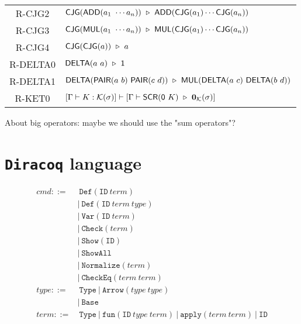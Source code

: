 \documentclass{article}
\begin{document}
\begin{longtable}{cl}
    R-CJG2
    & $ \CJG(\ADD(a_1\ \cdots a_n)) \ \reduce\ \ADD(\CJG(a_1) \cdots \CJG(a_n))$ \\
    R-CJG3
    & $ \CJG(\MUL(a_1\ \cdots a_n)) \ \reduce\ \MUL(\CJG(a_1) \cdots \CJG(a_n))$ \\
    R-CJG4
    & $ \CJG(\CJG(a)) \ \reduce\ a$ \\
    R-DELTA0
    & $ \DELTA(a\ a) \ \reduce\ \ONE$ \\
    R-DELTA1
    & $ \DELTA(\PAIR(a\ b)\ \PAIR(c\ d)) \ \reduce\ \MUL(\DELTA(a\ c)\ \DELTA(b\ d))$ \\
    R-KET0
    & $[\Gamma \vdash K : \KType(\sigma)]\vdash[\Gamma \vdash \SCR(\ZERO\ K)\ \reduce\ \ZEROK(\sigma)]$ \\
\end{longtable}

About big operators: maybe we should use the "sum operators"?



\section{\texttt{Diracoq} language}

\begin{align*}
    cmd ::=&\ \texttt{Def}(\texttt{ID}\ term) \\
        &|\ \texttt{Def}(\texttt{ID}\ term\ type) \\
        &|\ \texttt{Var}(\texttt{ID}\ term) \\
        &|\ \texttt{Check}(term) \\
        &|\ \texttt{Show}(\texttt{ID}) \\
        &|\ \texttt{ShowAll} \\
        &|\ \texttt{Normalize}(term) \\
        &|\ \texttt{CheckEq}(term\ term) \\
    type ::=&\ \texttt{Type}\ |\ \texttt{Arrow}(type\ type) \\
            &|\ \texttt{Base} \\
    term ::=&\ \texttt{Type}\ |\ \texttt{fun}(\texttt{ID}\ type\ term)\ |\ \texttt{apply}(term\ term)\ |\ \texttt{ID} \\
\end{align*}

\clearpage



\end{document}
